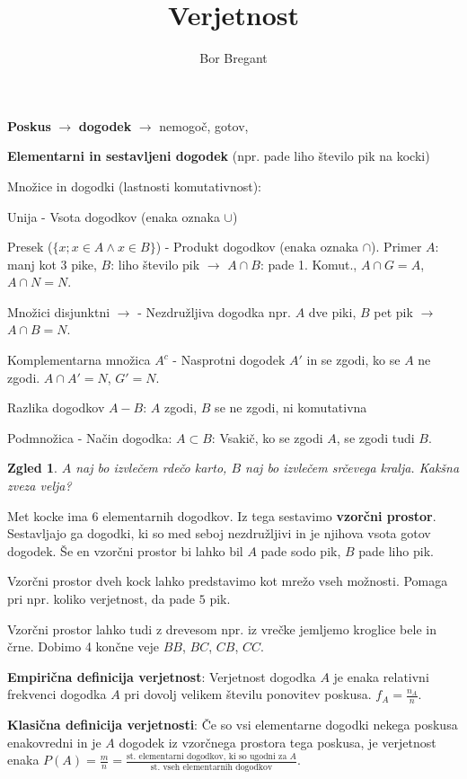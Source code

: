 \documentclass{article}
\title{Verjetnost}
\author{Bor Bregant}
\date{\vspace{-5ex}}
\newtheorem*{zgled}{Zgled}
\begin{document}
\maketitle

\textbf{Poskus} $\rightarrow$ \textbf{dogodek} $\rightarrow$ nemogoč, gotov, 

\textbf{Elementarni in sestavljeni dogodek} (npr. pade liho število pik na kocki)

Množice in dogodki (lastnosti komutativnost):

Unija - Vsota dogodkov (enaka oznaka $\cup$)

Presek ($\{x;x\in A \land x\in B\}$) - Produkt dogodkov (enaka oznaka $\cap$). Primer $A$: manj kot 3 pike, $B$: liho število pik $\rightarrow$ $A\cap B$: pade 1. Komut., $A\cap G=A$, $A\cap N=N$.

Množici disjunktni $\rightarrow$ - Nezdružljiva dogodka npr. $A$ dve piki, $B$ pet pik $\rightarrow$ $A\cap B=N$.

Komplementarna množica $A^c$ - Nasprotni dogodek $A'$ in se zgodi, ko se $A$ ne zgodi. $A\cap A'=N$, $G' =N$.

Razlika dogodkov $A-B$: $A$ zgodi, $B$ se ne zgodi, ni komutativna

Podmnožica - Način dogodka: $A\subset B$: Vsakič, ko se zgodi $A$, se zgodi tudi $B$.

\begin{zgled}
    $A$ naj bo izvlečem rdečo karto, $B$ naj bo izvlečem srčevega kralja. Kakšna zveza velja?
\end{zgled}

Met kocke ima $6$ elementarnih dogodkov. Iz tega sestavimo \textbf{vzorčni prostor}. Sestavljajo ga dogodki, ki so med seboj nezdružljivi in je njihova vsota gotov dogodek.
Še en vzorčni prostor bi lahko bil $A$ pade sodo pik, $B$ pade liho pik.

Vzorčni prostor dveh kock lahko predstavimo kot mrežo vseh možnosti. Pomaga pri npr. koliko verjetnost, da pade $5$ pik.

Vzorčni prostor lahko tudi z drevesom npr. iz vrečke jemljemo kroglice bele in črne. Dobimo 4 končne veje $BB$, $BC$, $CB$, $CC$.

\textbf{Empirična definicija verjetnost}: Verjetnost dogodka $A$ je enaka relativni frekvenci dogodka $A$ pri dovolj velikem številu ponovitev poskusa. $f_A =\frac{n_A}{n}$.

\textbf{Klasična definicija verjetnosti}: Če so vsi elementarne dogodki nekega poskusa enakovredni in je $A$ dogodek iz vzorčnega prostora tega poskusa, je verjetnost enaka $P(A)=\frac{m}{n}=\frac{\text{st. elementarni dogodkov, ki so ugodni za $A$}}{\text{st. vseh elementarnih dogodkov}}$.
\end{document}
